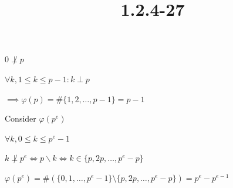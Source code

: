 \documentclass{article}
\title{1.2.4-27}
\begin{document}
\maketitle

\( 0 \not\perp p \)

\( \forall k, 1 \leq k \leq p - 1: k \perp p \)

\( \implies \varphi(p) = \#\{1,2,\ldots,p-1\} = p - 1 \)

Consider \( \varphi(p^e) \)

\( \forall k, 0 \leq k \leq p^e - 1 \)

\( k \not\perp p^e \iff p \backslash k \iff k \in \{ p, 2p, \ldots, p^e - p \} \)

\( \varphi(p^e) = \#(\{0,1,\ldots,p^e-1\} \setminus \{ p, 2p, \ldots, p^e - p \}) = p^e - p^{e-1} \)
\end{document}
